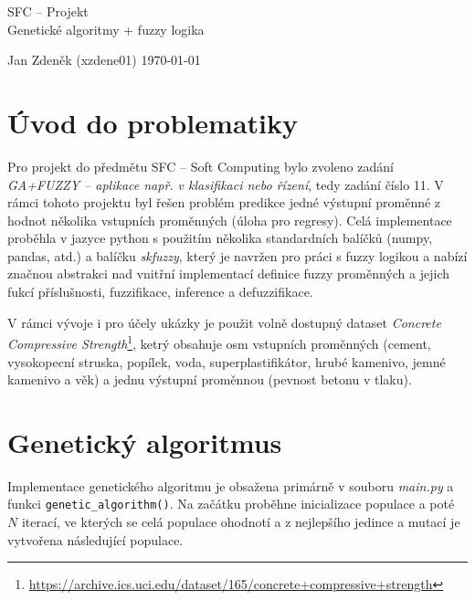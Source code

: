 \documentclass{article}
\begin{document}
\begin{titlepage}
    \centering
    \vspace*{3cm}

    \Huge SFC -- Projekt \\[0.5cm]
    \huge Genetické algoritmy + fuzzy logika

    \vfill %

    \begin{flushleft}
        \Large Jan Zdeněk (xzdene01) \hfill \today
    \end{flushleft}
\end{titlepage}

\tableofcontents

\newpage
\section{Úvod do problematiky}

Pro projekt do předmětu SFC -- Soft Computing bylo zvoleno zadání \emph{GA+FUZZY -- aplikace např. v klasifikaci nebo řízení}, tedy zadání číslo 11. V rámci tohoto projektu byl řešen problém predikce jedné výstupní proměnné z hodnot několika vstupních proměnných (úloha pro regresy). Celá implementace proběhla v jazyce python s použitím několika standardních balíčků (numpy, pandas, atd.) a balíčku \emph{skfuzzy}, který je navržen pro práci s fuzzy logikou a nabízí značnou abstrakci nad vnitřní implementací definice fuzzy proměnných a jejich fukcí příslušnosti, fuzzifikace, inference a defuzzifikace.

V rámci vývoje i pro účely ukázky je použit volně dostupný dataset \emph{Concrete Compressive Strength}\footnote{\url{https://archive.ics.uci.edu/dataset/165/concrete+compressive+strength}}, ketrý obsahuje osm vstupních proměnných (cement, vysokopecní struska, popílek, voda, superplastifikátor, hrubé kamenivo, jemné kamenivo a věk) a jednu výstupní proměnnou (pevnost betonu v tlaku).

\section{Genetický algoritmus}

Implementace genetického algoritmu je obsažena primárně v souboru \emph{main.py} a funkci \texttt{genetic\_algorithm()}. Na začátku proběhne inicializace populace a poté $N$ iterací, ve kterých se celá populace ohodnotí a z nejlepšího jedince a mutací je vytvořena následující populace.
\end{document}
